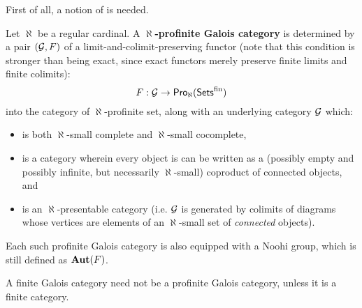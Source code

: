                     First of all, a notion of  is needed.
                    \begin{definition} \label{def: profinite_galois_theories}
                        Let $\aleph$ be a regular cardinal. A \textbf{$\aleph$-profinite Galois category} is determined by a pair $(\mathcal{G}, F)$ of a limit-and-colimit-preserving functor (note that this condition is stronger than being exact, since exact functors merely preserve finite limits and finite colimits):
                            $$F: \mathcal{G} \to \mathsf{Pro}_{\aleph}(\mathsf{Sets}^{\mathrm{fin}})$$
                        into the category of $\aleph$-profinite set, along with an underlying category $\mathcal{G}$ which:
                            \begin{itemize}
                                \item is both $\aleph$-small complete and $\aleph$-small cocomplete,
                                \item is a category wherein every object is can be written as a (possibly empty and possibly infinite, but necessarily $\aleph$-small) coproduct of connected objects, and
                                \item is an $\aleph$-presentable category (i.e. $\mathcal{G}$ is generated by colimits of diagrams whose vertices are elements of an $\aleph$-small set of \textit{connected} objects).
                            \end{itemize}
                        Each such profinite Galois category is also equipped with a Noohi group, which is still defined as $\mathbf{Aut}(F)$.
                    \end{definition}
                    \begin{remark}
                        A finite Galois category need not be a profinite Galois category, unless it is a finite category. 
                    \end{remark}
                        
